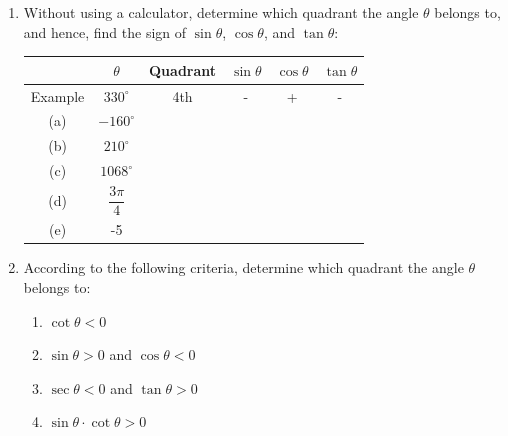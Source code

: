 \documentclass{report}
\begin{document}
\begin{enumerate}
    \item Without using a calculator, determine which quadrant the angle $\theta$ belongs to, and hence, find the sign of $\sin \theta$, $\cos \theta$, and $\tan \theta$:
    
    \begin{center}
        \begin{tabular}{|c|c|c|c|c|c|}
            \cline { 2 - 6 } \multicolumn{1}{c|}{} & $\theta$ & Quadrant & $\sin \theta$ & $\cos \theta$ & $\tan \theta$ \\
            \hline Example & $330^{\circ}$ & 4th & - & + & - \\
            \hline (a) & $-160^{\circ}$ & & & & \\
            \hline (b) & $210^{\circ}$ & & & & \\
            \hline (c) & $1068^{\circ}$ & & & & \\
            \hline (d) & $\dfrac{3 \pi}{4}$ & & & & \\
            \hline (e) & -5 & & & & \\
            \hline
            \end{tabular}
    \end{center}
    \item According to the following criteria, determine which quadrant the angle $\theta$ belongs to:
    \begin{multicols}{2}
        \begin{enumerate}[label=(\alph*)]
            \item $\cot \theta<0$
            \item $\sin \theta>0$ and $\cos \theta<0$
            \item $\sec \theta<0$ and $\tan \theta>0$
            \item $\sin \theta \cdot \cot \theta>0$
        \end{enumerate}
    \end{multicols}
\end{enumerate}
\end{document}
